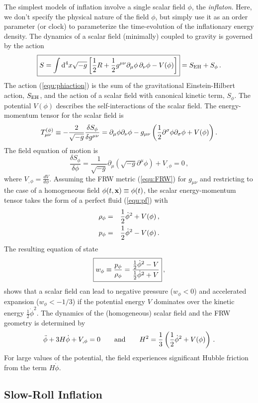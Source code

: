 \documentclass[12pt,letterpaper,rotate]{article}
\def\beq{\begin{equation}}
\def\eeq{\end{equation}}
\def\d{{\rm d}}
\begin{document}
{The simplest models of inflation involve a single scalar field $\phi$, the {\it inflaton}.
Here, we don't specify the physical nature of the field $\phi$, but simply use it as an order parameter (or clock) to parameterize the time-evolution of the inflationary energy density.
The dynamics of a scalar field (minimally) coupled to gravity is governed by the 
action 
\beq
\label{equ:phiaction}
\fbox{$\displaystyle
S = \int \d^4 x \sqrt{-g} \left[\frac{1}{2} R + {1\over 2} g^{\mu \nu} \partial_\mu\phi \, \partial_\nu\phi
-V(\phi) \right]$} = S_{\rm EH} + S_\phi\, .
\eeq
The action (\ref{equ:phiaction}) is the sum of the gravitational Einstein-Hilbert action, $S_{\rm EH}$, and the action of a scalar field  with canonical kinetic term, $S_\phi$.
The potential $V(\phi)$ describes the self-interactions of the scalar field.
The energy-momentum tensor for the scalar field is %
\beq
T_{\mu\nu}^{(\phi)} \equiv -\frac{2}{\sqrt{-g}} \frac{\delta S_\phi}{\delta g^{\mu \nu}} = \partial_\mu\phi\partial_\nu\phi-g_{\mu\nu}
\left({1\over 2}\partial^\sigma\phi\partial_\sigma\phi
+V(\phi)\right).
\label{Tscalarfield}
\eeq
The field equation of motion is
\beq
\frac{\delta S_\phi}{\delta \phi} = \frac{1}{\sqrt{-g}} \partial_\mu (\sqrt{-g} \partial^\mu \phi) + V_{, \phi}= 0\, ,
\eeq
where $V_{, \phi} = \frac{dV}{d\phi}$.
Assuming the FRW metric (\ref{equ:FRW}) for $g_{\mu \nu}$ and restricting to the case of a homogeneous field $\phi(t, {\bf x}) \equiv \phi(t)$, the scalar energy-momentum tensor takes the form of a perfect fluid (\ref{equ:pf}) with
\begin{eqnarray}
\rho_\phi &=& {1\over 2}\dot\phi^2+V(\phi)\, , \\
p_\phi &=& {1\over 2}\dot\phi^2-V(\phi)\, .
\end{eqnarray}
The resulting equation of state
\beq
\fbox{$\displaystyle
w_\phi  \equiv \frac{p_\phi}{\rho_\phi} = \frac{\frac{1}{2} \dot{\phi}^2 -V}{\frac{1}{2} \dot{\phi}^2 +V}$}\, ,
\eeq
shows that a scalar field can lead to negative pressure ($w_\phi< 0$) and accelerated expansion ($w_\phi<-1/3$) if the potential energy $V$ dominates over the kinetic energy $\frac{1}{2} \dot{\phi}^2$.
The dynamics of the (homogeneous) scalar field 
and the FRW geometry is determined by
\beq
\ddot\phi+3H\dot \phi+V_{,\phi}=0 \qquad {\rm and} \qquad H^2={1\over 3}\left({1\over 2}\dot\phi^2+V(\phi)\right)\, .
\eeq
For large values of the potential, the field experiences significant Hubble friction from the term $H \dot \phi$.

\subsection{Slow-Roll Inflation}
\label{sec:SR}

}
\end{document}

